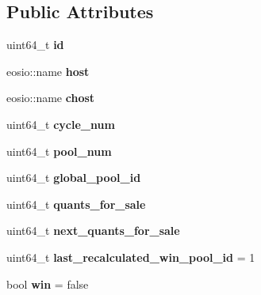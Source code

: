 \subsection*{Public Attributes}
\begin{DoxyCompactItemize}
\item 
\mbox{\label{structeosio_1_1balance_a4108c954aff6120398b436af885ee1e5}} 
uint64\+\_\+t {\bfseries id}
\item 
\mbox{\label{structeosio_1_1balance_a3d9257d714d1d39e3770d5aeda4d9f90}} 
eosio\+::name {\bfseries host}
\item 
\mbox{\label{structeosio_1_1balance_a4c1cbc34dd3a23e3c6b4a70dbffe6f48}} 
eosio\+::name {\bfseries chost}
\item 
\mbox{\label{structeosio_1_1balance_a577c2d96a70ba2520e25f6a6f1e557e9}} 
uint64\+\_\+t {\bfseries cycle\+\_\+num}
\item 
\mbox{\label{structeosio_1_1balance_a437ab45da62708b7facd1a78916d2e75}} 
uint64\+\_\+t {\bfseries pool\+\_\+num}
\item 
\mbox{\label{structeosio_1_1balance_a5632af7bc642b2594f060af98d8f3186}} 
uint64\+\_\+t {\bfseries global\+\_\+pool\+\_\+id}
\item 
\mbox{\label{structeosio_1_1balance_a8ee4d417c434002c55195416dd98dc02}} 
uint64\+\_\+t {\bfseries quants\+\_\+for\+\_\+sale}
\item 
\mbox{\label{structeosio_1_1balance_a7450d3b30e811d9f617626b8c1b37b41}} 
uint64\+\_\+t {\bfseries next\+\_\+quants\+\_\+for\+\_\+sale}
\item 
\mbox{\label{structeosio_1_1balance_a1957d8b4780f9abe37c8dabc96ca2d9d}} 
uint64\+\_\+t {\bfseries last\+\_\+recalculated\+\_\+win\+\_\+pool\+\_\+id} = 1
\item 
\mbox{\label{structeosio_1_1balance_ab01386c95561f01922cca3f6b365e2bb}} 
bool {\bfseries win} = false

\end{DoxyCompactItemize}
